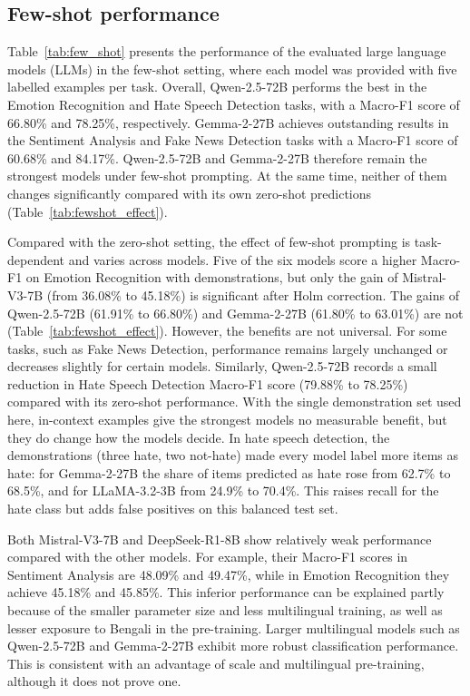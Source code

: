 \documentclass[10pt,letterpaper]{article}
\begin{document}
\subsection*{Few-shot performance}
\label{sec:few_shot}


Table~\ref{tab:few_shot} presents the performance of the evaluated large language models (LLMs) in the few-shot setting, where each model was provided with five labelled examples per task. Overall, Qwen-2.5-72B performs the best in the Emotion Recognition and Hate Speech Detection tasks, with a Macro-F1 score of 66.80\% and 78.25\%, respectively. Gemma-2-27B achieves outstanding results in the Sentiment Analysis and Fake News Detection tasks with a Macro-F1 score of 60.68\% and 84.17\%. Qwen-2.5-72B and Gemma-2-27B therefore remain the strongest models under few-shot prompting. At the same time, neither of them changes significantly compared with its own zero-shot predictions (Table~\ref{tab:fewshot_effect}).

Compared with the zero-shot setting, the effect of few-shot prompting is task-dependent and varies across models. Five of the six models score a higher Macro-F1 on Emotion Recognition with demonstrations, but only the gain of Mistral-V3-7B (from 36.08\% to 45.18\%) is significant after Holm correction. The gains of Qwen-2.5-72B (61.91\% to 66.80\%) and Gemma-2-27B (61.80\% to 63.01\%) are not (Table~\ref{tab:fewshot_effect}). However, the benefits are not universal. For some tasks, such as Fake News Detection, performance remains largely unchanged or decreases slightly for certain models. Similarly, Qwen-2.5-72B records a small reduction in Hate Speech Detection Macro-F1 score (79.88\% to 78.25\%) compared with its zero-shot performance. With the single demonstration set used here, in-context examples give the strongest models no measurable benefit, but they do change how the models decide. In hate speech detection, the demonstrations (three hate, two not-hate) made every model label more items as hate: for Gemma-2-27B the share of items predicted as hate rose from 62.7\% to 68.5\%, and for LLaMA-3.2-3B from 24.9\% to 70.4\%. This raises recall for the hate class but adds false positives on this balanced test set.

Both Mistral-V3-7B and DeepSeek-R1-8B show relatively weak performance compared with the other models. For example, their Macro-F1 scores in Sentiment Analysis are 48.09\% and 49.47\%, while in Emotion Recognition they achieve 45.18\% and 45.85\%. This inferior performance can be explained partly because of the smaller parameter size and less multilingual training, as well as lesser exposure to Bengali in the pre-training. Larger multilingual models such as Qwen-2.5-72B and Gemma-2-27B exhibit more robust classification performance. This is consistent with an advantage of scale and multilingual pre-training, although it does not prove one.
\end{document}
